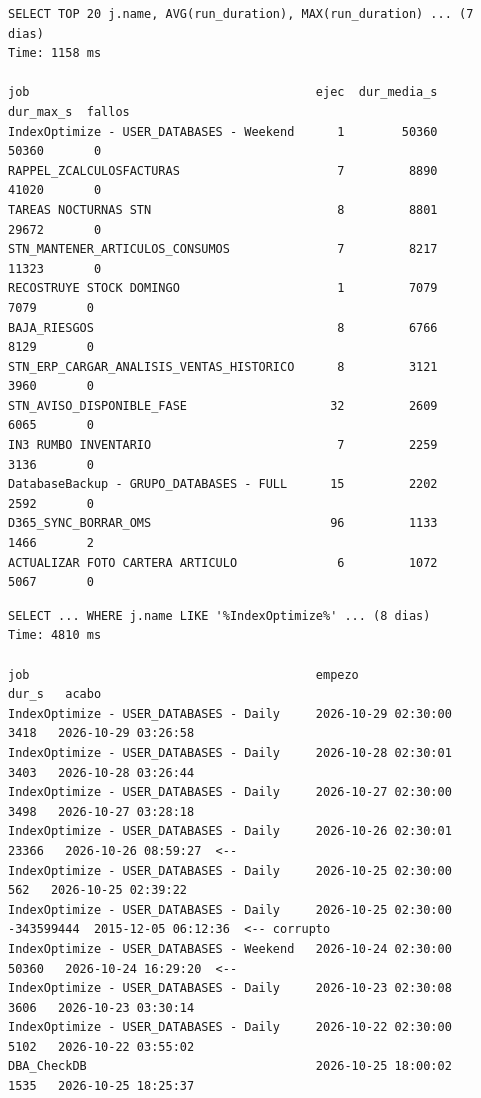 \documentclass[11pt,a4paper]{article}
\begin{document}
\begin{lstlisting}[style=salida]
SELECT TOP 20 j.name, AVG(run_duration), MAX(run_duration) ... (7 dias)
Time: 1158 ms

job                                        ejec  dur_media_s  dur_max_s  fallos
IndexOptimize - USER_DATABASES - Weekend      1        50360      50360       0
RAPPEL_ZCALCULOSFACTURAS                      7         8890      41020       0
TAREAS NOCTURNAS STN                          8         8801      29672       0
STN_MANTENER_ARTICULOS_CONSUMOS               7         8217      11323       0
RECOSTRUYE STOCK DOMINGO                      1         7079       7079       0
BAJA_RIESGOS                                  8         6766       8129       0
STN_ERP_CARGAR_ANALISIS_VENTAS_HISTORICO      8         3121       3960       0
STN_AVISO_DISPONIBLE_FASE                    32         2609       6065       0
IN3 RUMBO INVENTARIO                          7         2259       3136       0
DatabaseBackup - GRUPO_DATABASES - FULL      15         2202       2592       0
D365_SYNC_BORRAR_OMS                         96         1133       1466       2
ACTUALIZAR FOTO CARTERA ARTICULO              6         1072       5067       0
\end{lstlisting}

\begin{lstlisting}[style=salida]
SELECT ... WHERE j.name LIKE '%IndexOptimize%' ... (8 dias)
Time: 4810 ms

job                                        empezo                 dur_s   acabo
IndexOptimize - USER_DATABASES - Daily     2026-10-29 02:30:00     3418   2026-10-29 03:26:58
IndexOptimize - USER_DATABASES - Daily     2026-10-28 02:30:01     3403   2026-10-28 03:26:44
IndexOptimize - USER_DATABASES - Daily     2026-10-27 02:30:00     3498   2026-10-27 03:28:18
IndexOptimize - USER_DATABASES - Daily     2026-10-26 02:30:01    23366   2026-10-26 08:59:27  <--
IndexOptimize - USER_DATABASES - Daily     2026-10-25 02:30:00      562   2026-10-25 02:39:22
IndexOptimize - USER_DATABASES - Daily     2026-10-25 02:30:00  -343599444  2015-12-05 06:12:36  <-- corrupto
IndexOptimize - USER_DATABASES - Weekend   2026-10-24 02:30:00    50360   2026-10-24 16:29:20  <--
IndexOptimize - USER_DATABASES - Daily     2026-10-23 02:30:08     3606   2026-10-23 03:30:14
IndexOptimize - USER_DATABASES - Daily     2026-10-22 02:30:00     5102   2026-10-22 03:55:02
DBA_CheckDB                                2026-10-25 18:00:02     1535   2026-10-25 18:25:37
\end{lstlisting}
\end{document}
